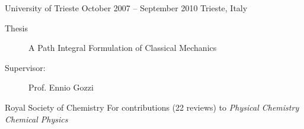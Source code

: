 \documentclass[10pt,a4paper,ragged2e,withhyper]{altacv}
\begin{document}
\begin{paracol}{2}
\medskip

        {University of Trieste}
        {October 2007 -- September 2010}
        {Trieste, Italy}
        \small{
          \begin{description}
          \item[Thesis]
            A Path Integral Formulation of Classical Mechanics
          \item[Supervisor:]
            Prof. Ennio Gozzi
          \end{description}
        }

\medskip
{}

        {Royal Society of Chemistry}
        {}
        {}
        \small{
          For contributions (22 reviews) to \textit{Physical Chemistry Chemical Physics}
          }


\nocite{*}



\printbibliography[heading=pubtype,title={\printinfo{\faFile*[regular]}{Journal Articles (selected)}},type=article]

\divider

\printbibliography[heading=pubtype,title={\printinfo{\faCheck}{Project deliverables}},type=misc]



\switchcolumn










\end{paracol}
\end{document}
